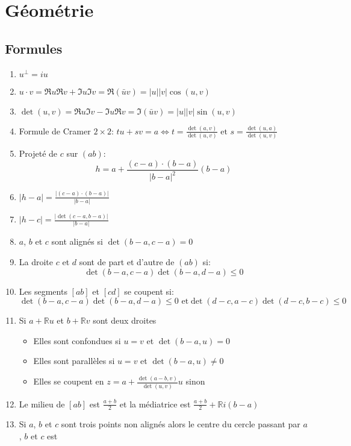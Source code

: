 \documentclass[10pt,twocolumn]{article}
\newcommand{\R}{\mathbb{R}}
\newcommand{\abs}[1]{\left\lvert{ #1 }\right\rvert}
\renewcommand{\leq}{\leqslant}
\begin{document}
\section{Géométrie}

\subsection{Formules}
\begin{enumerate}
    \item $u^\perp = iu$
    \item $u \cdot v = \Re u \Re v + \Im u \Im v = \Re(\bar u v) = \abs u \abs v \cos(u, v)$
    \item $\det(u, v) = \Re u \Im v - \Im u \Re v = \Im(\bar u v) = \abs u \abs v \sin(u, v)$
    \item Formule de Cramer $2 \times 2$: $tu + sv = a \iff t = \frac{\det(a, v)}{\det(u, v)} \text{ et } s = \frac{\det(u,a)}{\det(u,v)}$
    \item Projet\'e de $c$ sur $(ab)$:
    $$
        h = a + \frac{(c - a)\cdot(b - a)}{\abs{b - a}^2}(b - a)
    $$
    \item $\abs{h - a} = \frac{\abs{(c - a)\cdot(b - a)}}{\abs{b - a}}$
    \item $\abs{h - c} = \frac{\abs{\det(c - a, b - a)}}{\abs{b - a}}$
    \item $a$, $b$ et $c$ sont align\'es si $\det(b - a, c - a) = 0$
    \item La droite $c$ et $d$ sont de part et d'autre de $(ab)$ si:
    $$
        \det(b - a, c - a) \det(b - a, d - a) \leq 0
    $$
    \item Les segments $[ab]$ et $[cd]$ se coupent si:
    $$
        \det(b - a, c - a)\det(b - a, d - a) \leq 0 \text{ et} \det(d - c, a - c)\det(d - c, b - c) \leq 0
    $$
    \item Si $a + \R u$ et $b + \R v$ sont deux droites
        \begin{itemize}
            \item Elles sont confondues si $u = v$ et $\det(b - a, u) = 0$
            \item Elles sont parall\`eles si $u = v$ et $\det(b - a, u) \neq 0$
            \item Elles se coupent en $z = a + \frac{\det(a - b, v)}{\det(u, v)}u$ sinon
        \end{itemize}
    \item Le milieu de $[ab]$ est $\frac{a+b}{2}$ et la m\'ediatrice est $\frac{a+b}{2} + \R i(b-a)$
    \item Si $a$, $b$ et $c$ sont trois points non align\'es alors le centre du cercle passant par $a$, $b$ et $c$ est

\end{enumerate}
\end{document}
